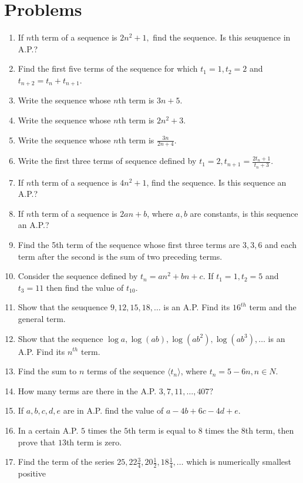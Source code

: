 \section{Problems}
\begin{enumerate}
\item If $n$th term of a sequence is $2n^2 + 1,$ find the sequence. Is this seuquence in A.P.?
\item Find the first five terms of the sequence for which $t_1 = 1, t_2 = 2$ and $t_{n + 2} = t_n + t_{n + 1}$.
\item Write the sequence whose $n$th term is $3n + 5$.
\item Write the sequence whose $n$th term is $2n^2 + 3$.
\item Write the sequence whose $n$th term is $\frac{3n}{2n + 4}$.
\item Write the first three terms of sequence defined by $t_1 = 2, t_{n + 1} = \frac{2t_n + 1}{t_n + 3}$.
\item If $n$th term of a sequence is $4n^2 + 1$, find the sequence. Is this sequence an A.P.?
\item If $n$th term of a sequence is $2an + b$, where $a, b$ are constants, is this sequence an A.P.?
\item Find the 5th term of the sequence whose first three terms are $3, 3, 6$ and each term after the second is the sum of two
  preceding terms.
\item Consider the sequence defined by $t_n = an^2 + bn + c$. If $t_1 = 1, t_2 = 5$ and $t_3 = 11$ then find the value of
  $t_{10}$.
\item Show that the seuquence $9, 12, 15, 18, \ldots$ is an A.P. Find its $16^{th}$ term and the general term.
\item Show that the sequence $\log a, \log (ab), \log(ab^2), \log (ab^3), \ldots$ is an A.P. Find its $n^{th}$ term.
\item Find the sum to $n$ terms of the sequence $\langle t_n \rangle$, where $t_n = 5 -6n, n\in N$.
\item How many terms are there in the A.P. $3, 7, 11, \ldots, 407?$
\item If $a, b, c, d, e$ are in A.P. find the value of $a - 4b + 6c - 4d + e$.
\item In a certain A.P. $5$ times the $5$th term is equal to $8$ times the $8$th term, then prove that $13$th term is
  zero.
\item Find the term of the series $25, 22\frac{3}{4}, 20\frac{1}{2},18\frac{1}{4}, \ldots$ which is numerically smallest positive

\end{enumerate}
